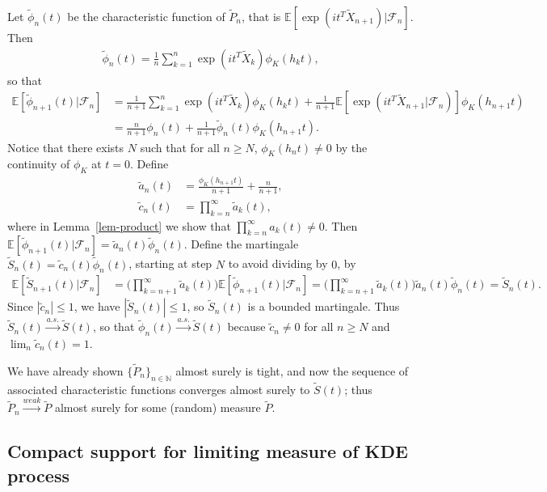 \documentclass[12pt]{article}
\newcommand{\N}{\mathbb{N}}
\newcommand{\E}{\mathbb{E}}
\newcommand{\F}{\mathcal{F}}
\begin{document}
Let $\tilde{\phi}_n(t)$ be the characteristic function of $\tilde{P}_n$, that is $\E[\exp(it^T \tilde{X}_{n+1}) | \F_n]$. Then
\begin{align*}
    \tilde{\phi}_n(t) = \frac{1}{n} \sum_{k = 1}^n \exp(it^T \tilde{X}_k) \phi_K(h_k t),
\end{align*}
so that
\begin{align*}
    \E[\tilde{\phi}_{n+1}(t) | \F_n] &= \frac{1}{n+1} \sum_{k = 1}^n \exp(it^T \tilde{X}_k) \phi_K(h_k t) + \frac{1}{n+ 1} \E[\exp(it^T \tilde{X}_{n+1} | \F_n)]\phi_K(h_{n+1}t) \\
    &= \frac{n}{n+1} \phi_n(t) + \frac{1}{n+1} \tilde{\phi}_n(t) \phi_K(h_{n+1} t).
\end{align*}
Notice that there exists $N$ such that for all $n \geq N$, $\phi_K(h_n t) \neq 0$ by the continuity of $\phi_K$ at $t = 0$. Define
\begin{align*}
    \tilde{a}_n(t) &= \frac{\phi_K(h_{n+1} t)}{n+1}  + \frac{n}{n+1},\\
    \tilde{c}_n(t) &= \prod_{k = n}^{\infty} \tilde{a}_k(t),
\end{align*}
where in Lemma~\ref{lem-product} we show that $\prod_{k = n}^{\infty} a_k(t) \neq  0$. Then $\E[\tilde{\phi}_{n+1}(t)|\F_n] = \tilde{a}_n(t) \tilde{\phi}_n(t)$.
Define the martingale $\tilde{S}_n(t) = \tilde{c}_n(t) \tilde{\phi}_n(t)$, starting at step $N$ to avoid dividing by $0$, by
\begin{align*}
    \E[\tilde{S}_{n + 1}(t) | \F_n] &= \Bigg(\prod_{k = n+1}^\infty \tilde{a}_k(t)\Bigg) \E[\tilde{\phi}_{n+1}(t) |\F_n] = \Bigg(\prod_{k = n+1}^\infty \tilde{a}_k(t)\Bigg) \tilde{a}_n(t) \tilde{\phi}_n(t) = \tilde{S}_n(t).
\end{align*}
Since $|\tilde{c}_n| \leq 1$, we have $|\tilde{S}_n(t)| \leq 1$, so $\tilde{S}_n(t)$ is a bounded martingale. Thus $\tilde{S}_n(t) \overset{a.s.}{\to} \tilde{S}(t)$, so that $\tilde{\phi}_n(t) \overset{a.s.} \to \tilde{S}(t)$ because $\tilde{c}_n \neq 0$ for all $n \geq N$ and $\lim_n \tilde{c}_n(t) = 1$.

We have already shown $\{\tilde{P}_n\}_{n \in \N}$ almost surely is tight, and now the sequence of associated characteristic functions converges almost surely to $\tilde{S}(t)$; thus $\tilde{P}_n \overset{weak}{\to} \tilde{P}$ almost surely for some (random) measure $\tilde{P}$.

\subsection{Compact support for limiting measure of KDE process}
\end{document}

